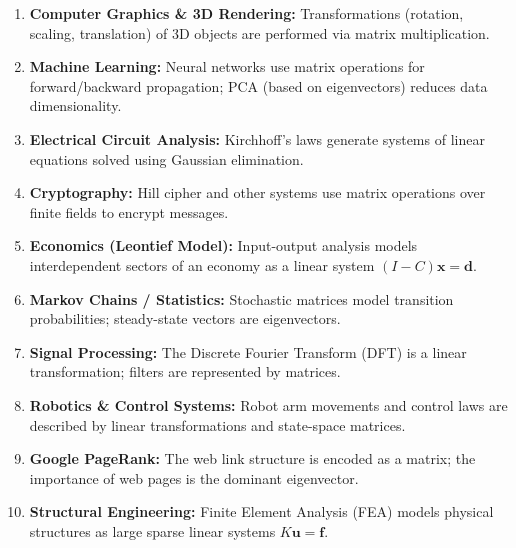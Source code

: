 \documentclass[12pt,a3paper]{article}
\begin{document}
\begin{tcolorbox}[enhanced,breakable,
  colback=cA!4,colframe=cA,boxrule=0.8pt,arc=5pt,
  title={\textbf{Answer --- Ten Applications of Linear Algebra}},
  fonttitle=\bfseries\color{white},colbacktitle=cA]
 
\begin{enumerate}[label=\textbf{\arabic*.},itemsep=3pt]
  \item \textbf{Computer Graphics \& 3D Rendering:} Transformations (rotation, scaling, translation) of 3D objects are performed via matrix multiplication.
  \item \textbf{Machine Learning:} Neural networks use matrix operations for forward/backward propagation; PCA (based on eigenvectors) reduces data dimensionality.
  \item \textbf{Electrical Circuit Analysis:} Kirchhoff's laws generate systems of linear equations solved using Gaussian elimination.
  \item \textbf{Cryptography:} Hill cipher and other systems use matrix operations over finite fields to encrypt messages.
  \item \textbf{Economics (Leontief Model):} Input-output analysis models interdependent sectors of an economy as a linear system $(I-C)\mathbf{x}=\mathbf{d}$.
  \item \textbf{Markov Chains / Statistics:} Stochastic matrices model transition probabilities; steady-state vectors are eigenvectors.
  \item \textbf{Signal Processing:} The Discrete Fourier Transform (DFT) is a linear transformation; filters are represented by matrices.
  \item \textbf{Robotics \& Control Systems:} Robot arm movements and control laws are described by linear transformations and state-space matrices.
  \item \textbf{Google PageRank:} The web link structure is encoded as a matrix; the importance of web pages is the dominant eigenvector.
  \item \textbf{Structural Engineering:} Finite Element Analysis (FEA) models physical structures as large sparse linear systems $K\mathbf{u}=\mathbf{f}$.
\end{enumerate}
 
\end{tcolorbox}
\end{document}
